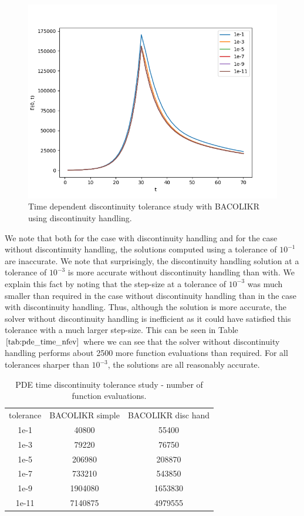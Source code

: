 \begin{figure}[H]
\centering
\includegraphics[width=0.7\linewidth]{./figures/pde_time_disc_bacolikr_disc_hand_tol}
\caption{Time dependent discontinuity tolerance study with BACOLIKR using discontinuity handling.}
\label{fig:pde_time_disc_bacolikr_disc_hand_tol}
\end{figure}

We note that both for the case with discontinuity handling and for the case without discontinuity handling, the solutions computed using a tolerance of $10^{-1}$ are inaccurate. We note that surprisingly, the discontinuity handling solution at a tolerance of $10^{-3}$ is more accurate without discontinuity handling than with. We explain this fact by noting that the step-size at a tolerance of $10^{-3}$ was much smaller than required in the case without discontinuity handling than in the case with discontinuity handling. Thus, although the solution is more accurate, the solver without discontinuity handling is inefficient as it could have satisfied this tolerance with a much larger step-size. This can be seen in Table $\ref{tab:pde_time_nfev}$ where we can see that the solver without discontinuity handling performs about 2500 more function evaluations than required. For all tolerances sharper than $10^{-3}$, the solutions are all reasonably accurate.

\begin{table}[h]
\caption {PDE time discontinuity tolerance study - number of function evaluations.} 
\label{tab:pde_time_nfev}
\begin{center}
\begin{tabular}{ c c c } 
tolerance & BACOLIKR simple  & BACOLIKR disc hand \\ 
1e-1      &   40800         &   55400 \\
1e-3      &   79220         &   76750 \\
1e-5      &  206980         &  208870 \\
1e-7      &  733210         &  543850 \\
1e-9      & 1904080         & 1653830 \\
1e-11     & 7140875         & 4979555 \\
\end{tabular}
\end{center}
\end{table}

